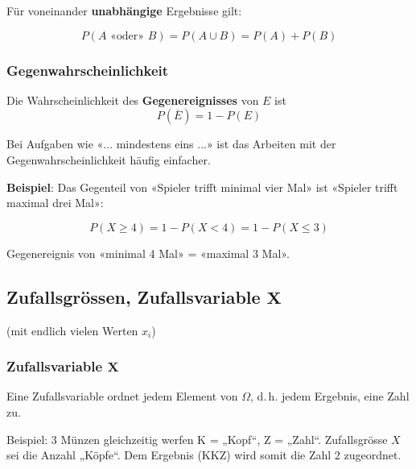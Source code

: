 \begin{multicols}{2}
Für voneinander \textbf{unabhängige} Ergebnisse 
gilt:

$$P(A\textrm{ «oder» }B) = P(A\cup B) = P(A) + P(B)$$
\headerUndFooterJedeSeite{}


\subsubsection*{Gegenwahrscheinlichkeit}
Die Wahrscheinlichkeit des \textbf{Gegenereignisses} von $E$ ist
$$P(\overline{E}) = 1- P(E)$$

Bei Aufgaben wie «... mindestens eins ...» ist das Arbeiten mit der
Gegenwahrscheinlichkeit häufig einfacher.

\textbf{Beispiel}: Das Gegenteil von «Spieler trifft minimal vier Mal»
ist «Spieler trifft maximal drei Mal»:

$$P(X \ge 4) = 1 - P(X < 4) = 1-P(X\le 3)$$

Gegenereignis von «minimal 4 Mal» = «maximal 3 Mal».

\headerUndFooterJedeSeite{}

\forceCB{}
\subsection*{Zufallsgrössen, Zufallsvariable $\mathbf{X}$}
\headerUndFooterJedeSeite{}

(mit endlich vielen Werten $x_i$)

\subsubsection*{Zufallsvariable $\mathbf{X}$}

Eine Zufallsvariable ordnet jedem Element von $\Omega$, d.\,h. jedem
Ergebnis, eine Zahl zu.

Beispiel: 3 Münzen gleichzeitig werfen K = „Kopf“, Z = „Zahl“.
Zufallsgrösse $X$ sei \zB die Anzahl „Köpfe“.
Dem Ergebnis (KKZ) wird somit die Zahl 2 zugeordnet.




\end{multicols}

